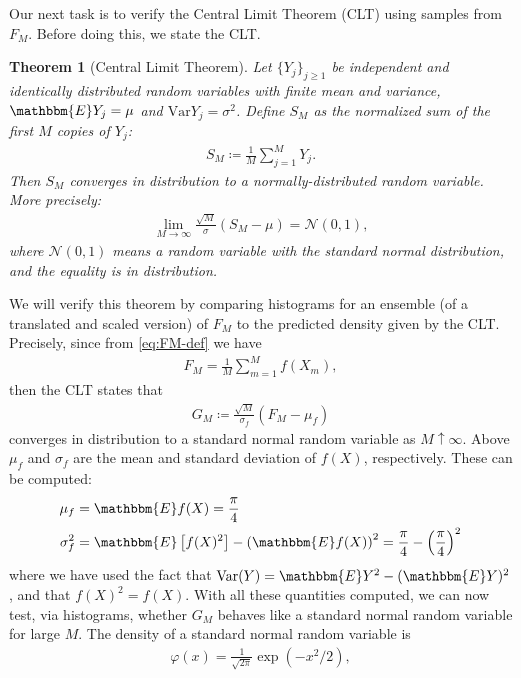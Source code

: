 \documentclass[11pt]{amsart}
\newcommand{\E}{\mathbbm{E}}
\newtheorem{theorem}{Theorem}
\begin{document}
Our next task is to verify the Central Limit Theorem (CLT) using samples from $F_M$. Before doing this, we state the CLT.
\begin{theorem}[Central Limit Theorem]
  Let $\{Y_j\}_{j \geq 1}$ be independent and identically distributed random variables with finite mean and variance, $\E Y_j = \mu$ and $\mathrm{Var} Y_j = \sigma^2$. Define $S_M$ as the normalized sum of the first $M$ copies of $Y_j$:
  \begin{align*}
    S_M \coloneqq \frac{1}{M} \sum_{j=1}^M Y_j.
  \end{align*}
  Then $S_M$ converges in distribution to a normally-distributed random variable. More precisely:
  \begin{align*}
    \lim_{M \rightarrow \infty} \frac{\sqrt{M}}{\sigma} \left( S_M - \mu \right) = \mathcal{N}(0, 1),
  \end{align*}
  where $\mathcal{N}(0,1)$ means a random variable with the standard normal distribution, and the equality is in distribution.
\end{theorem}
We will verify this theorem by comparing histograms for an ensemble (of a translated and scaled version) of $F_M$ to the predicted density given by the CLT. Precisely, since from \eqref{eq:FM-def} we have
\begin{align*}
  F_M = \frac{1}{M} \sum_{m=1}^M f(X_m),
\end{align*}
then the CLT states that 
\begin{align*}
  G_M \coloneqq \frac{\sqrt{M}}{\sigma_f} \left(F_M - \mu_f\right) 
\end{align*}
converges in distribution to a standard normal random variable as $M \uparrow \infty$. Above $\mu_f$ and $\sigma_f$ are the mean and standard deviation of $f(X)$, respectively. These can be computed:
\begin{align*}
  \mu_f &= \E f(X) = \frac{\pi}{4} \\
  \sigma^2_f &= \E\left[ f(X)^2\right] - \left( \E f(X)\right)^2 = \frac{\pi}{4} - \left(\frac{\pi}{4}\right)^2
\end{align*}
where we have used the fact that $\mathrm{Var}(Y) = \E Y^2 - (\E Y)^2$, and that $f(X)^2 = f(X)$. With all these quantities computed, we can now test, via histograms, whether $G_M$ behaves like a standard normal random variable for large $M$. The density of a standard normal random variable is
\begin{align*}
  \varphi(x) = \frac{1}{\sqrt{2 \pi}} \exp(-x^2/2),
\end{align*}
\end{document}
